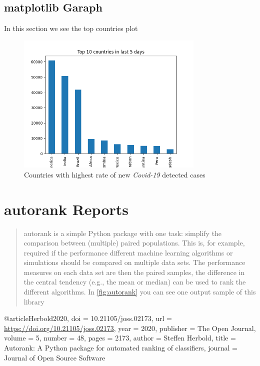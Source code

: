 \documentclass[12pt, letterpaper, twoside]{report}
\begin{document}
\section{matplotlib Garaph}
 In this section we see the top countries plot
\begin{figure}[ht]
    \centering
    \includegraphics[width=0.8\textwidth]{TopCountries.png}
    \caption{Countries with highest rate of new \textit{Covid-19} detected cases}
    \label{fig:TopCountries}
\end{figure}

\chapter{autorank Reports}
 

 \begin{abstract}
  autorank is a simple Python package with one task: simplify the comparison between (multiple) paired populations. This is, for example, required if the performance different machine learning algorithms or simulations should be compared on multiple data sets. The performance measures on each data set are then the paired samples, the difference in the central tendency (e.g., the mean or median) can be used to rank the different algorithms. In \ref{fig:autorank} you can see one output sample of this library
 \end{abstract}
 
@article{Herbold2020,
  doi = {10.21105/joss.02173},
  url = {\url{https://doi.org/10.21105/joss.02173}},
  year = {2020},
  publisher = {The Open Journal},
  volume = {5},
  number = {48},
  pages = {2173},
  author = {Steffen Herbold},
  title = {Autorank: A Python package for 
  automated ranking of classifiers},
  journal = {Journal of Open Source Software}
}

 
\end{document}
